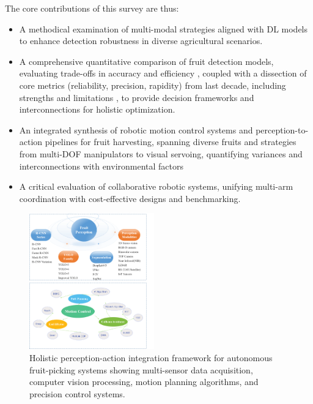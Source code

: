 \documentclass{ieeeaccess}
\begin{document}
The core contributions of this survey are thus:
\begin{itemize}
\item A methodical examination of multi-modal strategies aligned with DL models to enhance detection robustness in diverse agricultural scenarios.

\item A comprehensive quantitative comparison of fruit detection models, evaluating trade-offs in accuracy 
 and efficiency 
, coupled with a dissection of core metrics (reliability, precision, rapidity) from last decade, including strengths 
and limitations 
, to provide decision frameworks and interconnections for holistic optimization.

\item An integrated synthesis of robotic motion control systems and perception-to-action pipelines for fruit harvesting, spanning diverse fruits and strategies from multi-DOF manipulators to visual servoing, quantifying variances 
and interconnections with environmental factors

\item A critical evaluation of collaborative robotic systems, unifying multi-arm coordination with cost-effective designs and benchmarking.
\end{itemize}

\begin{figure}[h!]
    \centering
    \includegraphics[width=0.48\textwidth]{fig_struct2.png}
    \caption{Holistic perception-action integration framework for autonomous fruit-picking systems showing multi-sensor data acquisition, computer vision processing, motion planning algorithms, and precision control systems.}
    \label{fig:struct}
\end{figure}
\end{document}
